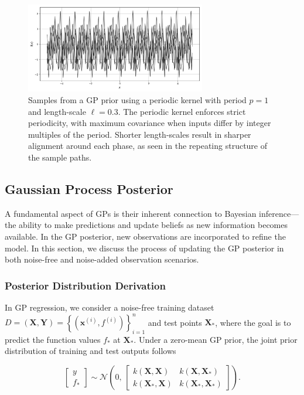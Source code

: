 \documentclass{ut-thesis}
\begin{document}
\begin{figure}[htbp]
    \centering
    \includegraphics[width=0.7\textwidth]{periodic.png}
    \caption[Gaussian Process samples with periodic kernel]{
        Samples from a GP prior using a periodic kernel with period \( p = 1 \) and length-scale \( \ell = 0.3 \).
        The periodic kernel enforces strict periodicity, with maximum covariance when inputs differ by integer multiples of the period.
        Shorter length-scales result in sharper alignment around each phase, as seen in the repeating structure of the sample paths.
    }
    \label{fig:periodic_gp_samples}
\end{figure}

\newpage
\subsection{Gaussian Process Posterior}

A fundamental aspect of GPs is their inherent connection to Bayesian inference—the ability to make predictions and update beliefs as new information becomes available. In the GP posterior, new observations are incorporated to refine the model. In this section, we discuss the process of updating the GP posterior in both noise-free and noise-added observation scenarios.

\subsubsection{Posterior Distribution Derivation}

In GP regression, we consider a noise-free training dataset $D = \left( \mathbf{X}, \mathbf{Y} \right) = \left\{ \left( \mathbf{x}^{(i)}, f^{(i)} \right) \right\}_{i=1}^n $ and test points $ \mathbf{X_*}$, where the goal is to predict the function values $ f_* $ at $ \mathbf{X_*} $. Under a zero-mean GP prior, the joint prior distribution of training and test outputs follows

\begin{equation}
    \begin{bmatrix}
y \\[6pt]
f_*
\end{bmatrix}
\sim
\mathcal{N}\!\left(
0,\,
\begin{bmatrix}
k(\mathbf{X}, \mathbf{X}) & k(\mathbf{X}, \mathbf{X_*}) \\[6pt]
k(\mathbf{X_*}, \mathbf{X}) & k(\mathbf{X_*}, \mathbf{X_*})
\end{bmatrix}
\right).
\end{equation}
\end{document}
